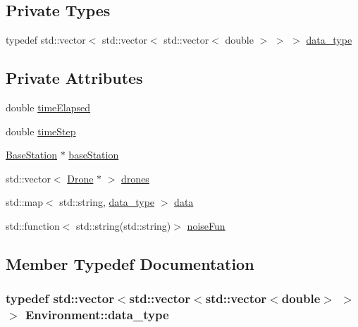 \subsection*{Private Types}
\begin{DoxyCompactItemize}
\item 
typedef std\+::vector$<$ std\+::vector$<$ std\+::vector$<$ double $>$ $>$ $>$ \hyperlink{class_environment_a7ac989afdd3bde4ea860c985ed1f8479}{data\+\_\+type}
\end{DoxyCompactItemize}
\subsection*{Private Attributes}
\begin{DoxyCompactItemize}
\item 
double \hyperlink{class_environment_a94758a1936023963eafaa129bb84f89d}{time\+Elapsed}
\item 
double \hyperlink{class_environment_a0eac119e9f0130f836f04224612dfb16}{time\+Step}
\item 
\hyperlink{class_base_station}{Base\+Station} $\ast$ \hyperlink{class_environment_a01e059baab4daf8833a638fab15eab31}{base\+Station}
\item 
std\+::vector$<$ \hyperlink{class_drone}{Drone} $\ast$ $>$ \hyperlink{class_environment_a3119b68685b61fc60e0a76918fa83f0a}{drones}
\item 
std\+::map$<$ std\+::string, \hyperlink{class_environment_a7ac989afdd3bde4ea860c985ed1f8479}{data\+\_\+type} $>$ \hyperlink{class_environment_a8f4846d547c4891a4a2493157c8f76d6}{data}
\item 
std\+::function$<$ std\+::string(std\+::string)$>$ \hyperlink{class_environment_a95650888a9bfb308a650c049a95cb6cb}{noise\+Fun}
\end{DoxyCompactItemize}


\subsection{Member Typedef Documentation}
\subsubsection[{\texorpdfstring{data\+\_\+type}{data_type}}]{\setlength{\rightskip}{0pt plus 5cm}typedef std\+::vector$<$std\+::vector$<$std\+::vector$<$double$>$ $>$ $>$ {\bf Environment\+::data\+\_\+type}\hspace{0.3cm}{\ttfamily [private]}}\hypertarget{class_environment_a7ac989afdd3bde4ea860c985ed1f8479}{}\label{class_environment_a7ac989afdd3bde4ea860c985ed1f8479}


